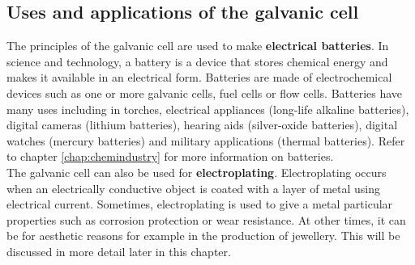 \subsection{Uses and applications of the galvanic cell}

The principles of the galvanic cell are used to make \textbf{electrical batteries}. In science and technology, a battery is a device that stores chemical energy and makes it available in an electrical form. Batteries are made of electrochemical devices such as one or more galvanic cells, fuel cells or flow cells. Batteries have many uses including in torches, electrical appliances (long-life alkaline batteries), digital cameras (lithium batteries), hearing aids (silver-oxide batteries), digital watches (mercury batteries) and military applications (thermal batteries). Refer to chapter \ref{chap:chemindustry} for more information on batteries.\\

The galvanic cell can also be used for \textbf{electroplating}. Electroplating occurs when an electrically conductive object is coated with a layer of metal using electrical current. Sometimes, electroplating is used to give a metal particular properties such as corrosion protection or wear resistance. At other times, it can be for aesthetic reasons for example in the production of jewellery. This will be discussed in more detail later in this chapter. 

